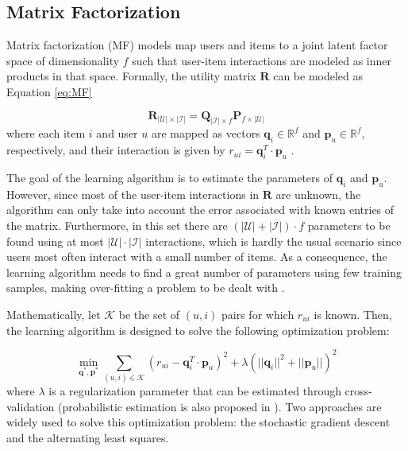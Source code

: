 \subsection{Matrix Factorization}

    Matrix factorization (MF)  models map users and items to a joint latent factor space of dimensionality $f$ such that user-item interactions are modeled as inner products in that space. Formally, the utility matrix $\mathbf{R}$ can be modeled as Equation \ref{eq:MF}
    
    \begin{equation}
        \label{eq:MF}
        \mathbf{R_{|\mathcal{U}| \times |\mathcal{I}|}} = \mathbf{Q}_{|\mathcal{I}| \times f} \mathbf{P}_{f \times |\mathcal{U}|} 
    \end{equation} where each item $i$ and user $u$ are mapped as vectors $\mathbf{q}_i \in \mathbb{R}^f$ and $\mathbf{p}_u \in \mathbb{R}^f$, respectively, and their interaction is given by $r_{ui} = \mathbf{q}^T_i \cdot \mathbf{p}_u$ \cite{2009MFTechniques}.
    
    The goal of the learning algorithm is to estimate the parameters of  $\mathbf{q}_i$ and $\mathbf{p}_u$. However, since most of the user-item interactions in $\mathbf{R}$ are unknown, the algorithm can only take into account the error associated with known entries of the matrix. Furthermore, in this set there are $(|\mathcal{U}|+|\mathcal{I}|)\cdot f$ parameters to be found using at most $|\mathcal{U}|\cdot |\mathcal{I}|$ interactions, which is hardly the usual scenario since users most often interact with a small number of items. As a consequence, the learning algorithm needs to find a great number of parameters using few training samples, making over-fitting a problem to be dealt with \cite{2008ALSWR}.
    
    Mathematically, let $\mathcal{K}$ be the set of $(u,i)$ pairs for which $r_{ui}$ is known. Then, the learning algorithm is designed to solve the following optimization problem: 
    
    \begin{equation}
        \label{eq:mf_min}
        \min_{\mathbf{q}^*, \mathbf{p}^*} \sum_{(u,i) \in \mathcal{K}} (r_{ui} - \mathbf{q}^T_i \cdot \mathbf{p}_u)^2 + \lambda (||\mathbf{q}_i||^2 + ||\mathbf{p}_u||)^2
    \end{equation} where $\lambda$ is a regularization parameter that can be estimated through cross-validation (probabilistic estimation is also proposed in \cite{2007ProbMF}). Two approaches are widely used to solve this optimization problem: the stochastic gradient descent and the alternating least squares. 
    
